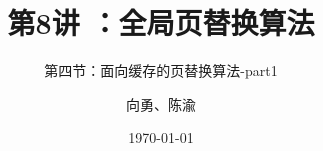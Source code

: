 



\title[第8讲]{第8讲 ：全局页替换算法} %
\subtitle{第四节：面向缓存的页替换算法-part1}
\author{向勇、陈渝} %
\date{\today} %




\begin{frame}
\titlepage %
\end{frame}

